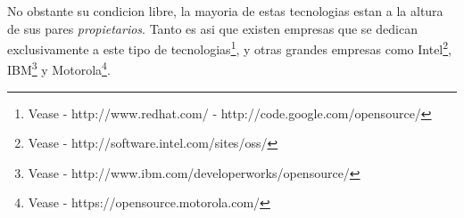 No obstante su condicion libre, la mayoria de estas tecnologias estan a la
altura de sus pares \emph{propietarios}. Tanto es asi que existen empresas que
se dedican exclusivamente a este tipo de tecnologias\footnote{Vease -
http://www.redhat.com/ - http://code.google.com/opensource/}, y otras grandes
empresas como Intel\footnote{Vease - http://software.intel.com/sites/oss/},
IBM\footnote{Vease - http://www.ibm.com/developerworks/opensource/} y
Motorola\footnote{Vease - https://opensource.motorola.com/}. \\










